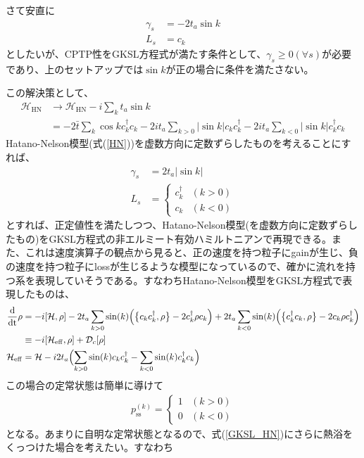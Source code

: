 \documentclass[dvipdfmx,autodetect-engine]{jsarticle}
\newcommand{\da}{\dagger}
\newcommand{\m}[1]{\mathcal{#1}}
\newcommand{\mr}[1]{\mathrm{#1}}
\newcommand{\dt}{\frac{\mr{d}}{\mr{dt}}}
\begin{document}
さて安直に
\begin{align}
    \gamma_s &= -2t_a\sin{k}\\
    L_s &= c_k
\end{align}
としたいが、CPTP性をGKSL方程式が満たす条件として、$\gamma_s \geq 0 (\forall s)$が必要であり、上のセットアップでは$\sin{k}$が正の場合に条件を満たさない。

この解決策として、
\begin{align}
    \m{H}_{\mr{HN}}&\rightarrow \m{H}_{\mr{HN}} - i \sum_k t_a\sin{k} \\
    &= -2\bar{t}\sum_k \cos{k}c^\da_kc_k - 2it_a\sum_{k>0}|\sin{k}|c_kc^\da_k  - 2it_a\sum_{k<0}|\sin{k}|c^\da_kc_k 
\end{align}
Hatano-Nelson模型(式(\ref{HN}))を虚数方向に定数ずらしたものを考えることにすれば、
\begin{align}
    \gamma_s &= 2t_a|\sin{k}|\\
    L_s &= \begin{cases}
        c^\da_k & (k>0)\\
        c_k & (k<0)
    \end{cases}
\end{align}
とすれば、正定値性を満たしつつ、Hatano-Nelson模型(を虚数方向に定数ずらしたもの)をGKSL方程式の非エルミート有効ハミルトニアンで再現できる。また、これは速度演算子の観点から見ると、正の速度を持つ粒子にgainが生じ、負の速度を持つ粒子にlossが生じるような模型になっているので、確かに流れを持つ系を表現していそうである。すなわちHatano-Nelson模型をGKSL方程式で表現したものは、
\begin{align}
    \dt \rho &= -i[\m{H}, \rho] - 2t_a\sum_{k>0} \sin(k)  \Bigl(\bigl\{c_k c_k^\da, \rho\bigr\}-2c_k^\da\rho c_k\Bigr) + 2t_a\sum_{k<0} \sin(k)  \Bigl(\bigl\{c_k^\da c_k, \rho\bigr\}-2c_k\rho c_k^\da\Bigr)\label{GKSL_HN}\\
    &\equiv -i[\m{H}_{\mr{eff}}, \rho] + \m{D}_c[\rho]\\
    \m{H}_{\mr{eff}} &= \m{H} - i2t_a \Bigl(\sum_{k>0} \sin(k) c_kc_k^\da - \sum_{k<0} \sin(k) c_k^\da c_k \Bigr)
\end{align}
この場合の定常状態は簡単に導けて
\begin{align}
    p^{(k)}_{\mr{ss}} = \begin{cases}
        1 & (k>0)\\
        0 & (k<0)
    \end{cases}
\end{align}
となる。あまりに自明な定常状態となるので、式(\ref{GKSL_HN})にさらに熱浴をくっつけた場合を考えたい。すなわち
\end{document}
